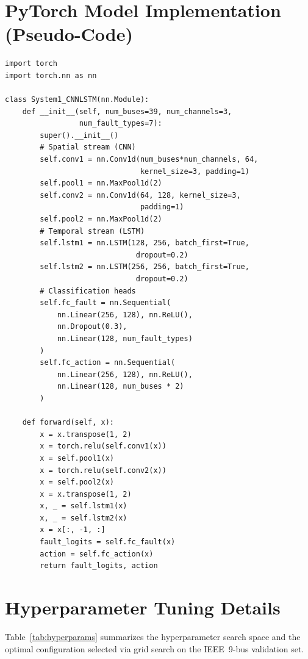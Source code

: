 \documentclass[journal]{IEEEtran}
\begin{document}
\appendices
\section{PyTorch Model Implementation (Pseudo-Code)}
\label{app:pytorch}

\begin{verbatim}
import torch
import torch.nn as nn

class System1_CNNLSTM(nn.Module):
    def __init__(self, num_buses=39, num_channels=3,
                 num_fault_types=7):
        super().__init__()
        # Spatial stream (CNN)
        self.conv1 = nn.Conv1d(num_buses*num_channels, 64,
                               kernel_size=3, padding=1)
        self.pool1 = nn.MaxPool1d(2)
        self.conv2 = nn.Conv1d(64, 128, kernel_size=3,
                               padding=1)
        self.pool2 = nn.MaxPool1d(2)
        # Temporal stream (LSTM)
        self.lstm1 = nn.LSTM(128, 256, batch_first=True,
                              dropout=0.2)
        self.lstm2 = nn.LSTM(256, 256, batch_first=True,
                              dropout=0.2)
        # Classification heads
        self.fc_fault = nn.Sequential(
            nn.Linear(256, 128), nn.ReLU(),
            nn.Dropout(0.3),
            nn.Linear(128, num_fault_types)
        )
        self.fc_action = nn.Sequential(
            nn.Linear(256, 128), nn.ReLU(),
            nn.Linear(128, num_buses * 2)
        )

    def forward(self, x):
        x = x.transpose(1, 2)
        x = torch.relu(self.conv1(x))
        x = self.pool1(x)
        x = torch.relu(self.conv2(x))
        x = self.pool2(x)
        x = x.transpose(1, 2)
        x, _ = self.lstm1(x)
        x, _ = self.lstm2(x)
        x = x[:, -1, :]
        fault_logits = self.fc_fault(x)
        action = self.fc_action(x)
        return fault_logits, action
\end{verbatim}

\section{Hyperparameter Tuning Details}
\label{app:hyperparams}

Table~\ref{tab:hyperparams} summarizes the hyperparameter search space and the optimal configuration selected via grid search on the IEEE~9-bus validation set.
\end{document}
